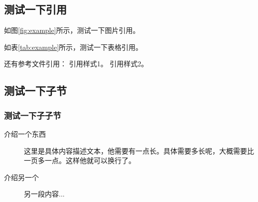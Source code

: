 \subsection{测试一下引用}

如图\ref{fig:example}所示，测试一下图片引用。

如表\ref{tab:example}所示，测试一下表格引用。

还有参考文件引用：
引用样式1\cite{example2025}。
引用样式2\parencite{example2025}。

\subsection{测试一下子节}
\subsubsection{测试一下子子节}

\begin{description}
    \item[介绍一个东西] 这里是具体内容描述文本，他需要有一点长。具体需要多长呢，大概需要比一页多一点。这样他就可以换行了。
    \item[介绍另一个] 另一段内容...
\end{description}